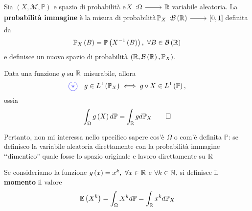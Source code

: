 \begin{define}
	Sia $\left(X,\mathcal{M},\mathbb{P}\right)$ e spazio di probabilità e $\funz{X}{\Omega}{\realset}$ variabile aleatoria.
	La \textbf{probabilità immagine} è la misura di probabilità $\funz{\mathbb{P}_X}{\mathcal{B}\left(\realset\right)}{\left[0,1\right]}$ definita da
	\begin{equation}
		\mathbb{P}_X\left(B\right)=\mathbb{P}\left(X^{-1}\left(B\right)\right),\ \forall B\in \mathcal{B\left(\realset\right)}
	\end{equation}
e definisce un nuovo spazio di probabilità $\left(\mathbb{R},\mathcal{B}\left(\mathbb{R}\right),\mathbb{P}_X\right)$.
\end{define}
\begin{theoremaqed}
	Data una funzione $g$ su $\mathbb{R}$ misurabile, allora
	\begin{equation}
		\textcolor{blue}{\circled{\ast}}\quad g\in L^{1}\left(\mathbb{P}_X\right)\iff g\circ X\in L^{1}\left(\mathbb{P}\right),
	\end{equation}
	ossia
	\begin{equation}
		\int_{\Omega}g\left(X\right)d\mathbb{P}=\int_{\mathbb{R}}gd\mathbb{P}_X\qedhere
	\end{equation}
\end{theoremaqed}
Pertanto, non mi interessa nello specifico sapere cos'è $\Omega$ o com'è definita $\mathbb{P}$: se definisco la variabile aleatoria direttamente con la probabilità immagine ‘‘dimentico'' quale fosse lo spazio originale e lavoro direttamente su $\mathbb{R}$
\begin{define}
	Se consideriamo la funzione $g\left(x\right)=x^k,\ \forall x\in\mathbb{R}$ e $\forall k\in\mathbb{N}$, si definisce il \textbf{momento} il valore
	\begin{equation*}
		\mathbb{E}\left(X^k\right)=\int_{\Omega}X^kd\mathbb{P}=\int_{\mathbb{R}}x^kd\mathbb{P}_X
	\end{equation*}
\end{define}
